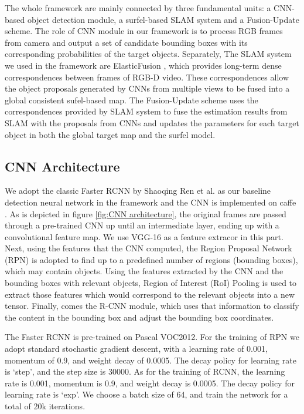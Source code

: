\documentclass[conference]{IEEEtran}
\begin{document}
The whole framework are mainly connected by three fundamental units: a CNN-based object detection module, a surfel-based SLAM system and a Fusion-Update scheme. The role of CNN module in our framework is to process RGB frames from camera and output a set of candidate bounding boxes with its corresponding probabilities of the target objects. Separately, The SLAM system we used in the framework are ElasticFusion \cite{Whelan15rss}, which provides long-term dense correspondences between frames of  RGB-D video. These correspondences allow the object proposals generated by CNNs from multiple views to be fused into a global consistent sufel-based map. The Fusion-Update scheme uses the correspondences provided by SLAM system to fuse the estimation results from SLAM with the proposals from CNNs and updates the parameters for each target object in both the global target map and the surfel model.


{\color{blue}\subsection{\textbf{CNN Architecture}}

We adopt the classic Faster RCNN by Shaoqing Ren et al. \cite{ren2015faster} as our baseline detection neural network in the framework and the CNN is implemented on caffe \cite{Jia2014}  . As is depicted in figure \ref{fig:CNN architecture}, the original frames are passed through a pre-trained CNN up until an intermediate layer, ending up with a convolutional feature map. We use VGG-16 as a feature extracor in this part. Next, using the features that the CNN computed, the Region Proposal Network (RPN) is adopted to find up to a predefined number of regions (bounding boxes), which may contain objects. Using the features extracted by the CNN and the bounding boxes with relevant objects, Region of Interest (RoI) Pooling is used to extract those features which would correspond to the relevant objects into a new tensor. Finally, comes the R-CNN module, which uses that information to classify the content in the bounding box and adjust the bounding box coordinates. 

The Faster RCNN is pre-trained on Pascal VOC2012. For the training of RPN we adopt standard stochastic gradient descent, with a learning rate of 0.001, momentum of 0.9, and weight decay of 0.0005. The decay policy for learning rate is `step', and the step size is 30000. As for the training of RCNN, the learning rate is 0.001, momentum is 0.9, and weight decay is 0.0005. The decay policy for learning rate is `exp'. We choose a batch size of 64, and train the network for a total of 20k iterations.}
\end{document}
